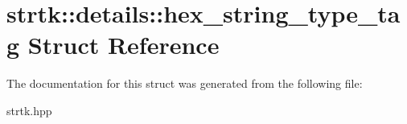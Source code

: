 \hypertarget{structstrtk_1_1details_1_1hex__string__type__tag}{\section{strtk\-:\-:details\-:\-:hex\-\_\-string\-\_\-type\-\_\-tag Struct Reference}
\label{structstrtk_1_1details_1_1hex__string__type__tag}
}


The documentation for this struct was generated from the following file\-:\begin{DoxyCompactItemize}
\item 
strtk.\-hpp\end{DoxyCompactItemize}
